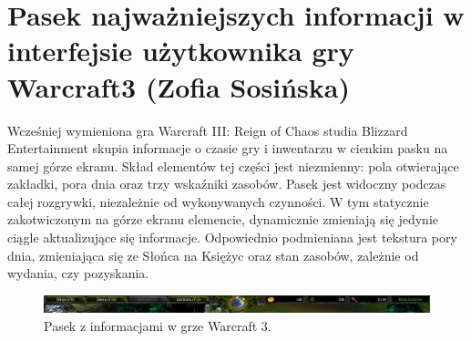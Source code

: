 \section{Pasek najważniejszych informacji w interfejsie użytkownika gry Warcraft3 (Zofia Sosińska)}
Wcześniej wymieniona gra Warcraft III: Reign of Chaos studia Blizzard Entertainment skupia informacje o czasie gry i inwentarzu w cienkim pasku na samej górze ekranu.
Skład elementów tej części jest niezmienny: pola otwierające zakładki, pora dnia oraz trzy wskaźniki zasobów. Pasek jest widoczny
podczas całej rozgrywki, niezależnie od wykonywanych czynności. W tym statycznie zakotwiczonym na górze ekranu elemencie, dynamicznie
zmieniają się jedynie ciągle aktualizujące się informacje. Odpowiednio podmieniana jest tekstura pory dnia, zmieniająca się ze Słońca
na Księżyc oraz stan zasobów, zależnie od wydania, czy pozyskania.


\begin{figure}[htbp]
    \centering
    \includegraphics[width=1.0\textwidth]{images/ui/warcraft3_gorny_pasek.png}
    \caption{Pasek z informacjami w grze Warcraft 3.}\label{fig:Warcraft3}
\end{figure}